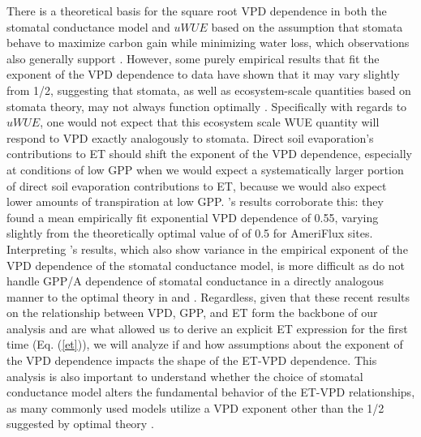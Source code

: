 There is a theoretical basis for the square root VPD dependence in
both the stomatal conductance model and $uWUE$ based on the assumption
that stomata behave to maximize carbon gain while minimizing water
loss, which observations also generally support \citep{Lloyd_1991,
  MEDLYN_2011, Lin_2015, Zhou_2014, Zhou_2015, Medlyn_2017}. However,
some purely empirical results that fit the exponent of the VPD
dependence to data have shown that it may vary slightly from 1/2,
suggesting that stomata, as well as ecosystem-scale quantities based
on stomata theory, may not always function optimally \citep{Zhou_2015,
  Lin_2018}. Specifically with regards to $uWUE$, one would not expect
that this ecosystem scale WUE quantity will respond to VPD exactly
analogously to stomata. Direct soil evaporation's contributions to ET
should shift the exponent of the VPD dependence, especially at
conditions of low GPP when we would expect a systematically larger
portion of direct soil evaporation contributions to ET, because we
would also expect lower amounts of transpiration at low GPP. \citet{Zhou_2015}'s
results corroborate this: they found a mean empirically fit
exponential VPD dependence of 0.55, varying slightly from the
theoretically optimal value of of 0.5 for AmeriFlux
sites. Interpreting \citet{Lin_2018}'s results, which also show
variance in the empirical exponent of the VPD dependence of the
stomatal conductance model, is more difficult as \citet{Lin_2018} do
not handle GPP/A dependence of stomatal conductance in a directly
analogous manner to the optimal theory in \citet{MEDLYN_2011} and
\citet{Medlyn_2017}. Regardless, given that these recent results on
the relationship between VPD, GPP, and ET \citep{MEDLYN_2011,
  Zhou_2014, Zhou_2015, Medlyn_2017} form the backbone of our analysis
and are what allowed us to derive an explicit ET expression for the
first time (Eq. (\ref{et})), we will analyze if and how assumptions
about the exponent of the VPD dependence impacts the shape of the
ET-VPD dependence. This analysis is also important to understand whether the choice of stomatal conductance model alters the fundamental behavior of the ET-VPD relationships, as many commonly used models  utilize a VPD exponent other than the 1/2 suggested by optimal theory \citep[e.g. ][ which uses an exponent of 1]{Leuning_1990}.

